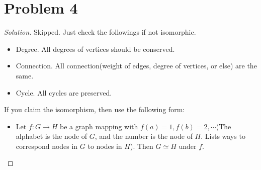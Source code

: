 \section*{Problem 4}
	\begin{proof} [Solution]
		Skipped. Just check the followings if not isomorphic.
		\begin{itemize}
			\item Degree. All degrees of vertices should be conserved.
			\item Connection. All connection(weight of edges, degree of vertices, or else) are the same.
			\item Cycle. All cycles are preserved.
		\end{itemize}
		If you claim the isomorphism, then use the following form:
		\begin{itemize}
			\item [] Let $f: G\rightarrow H$ be a graph mapping with $f(a) = 1, f(b) = 2, \cdots$(The alphabet is the node of $G$, and the number is the node of $H$. Lists ways to correspond nodes in $G$ to nodes in $H$). Then $G\simeq H$ under $f$.
		\end{itemize}
	\end{proof}